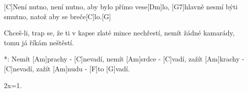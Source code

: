 
[C]Není nutno, není nutno, aby bylo přímo vese[Dm]lo,
[G7]hlavně nesmí býti smutno, natož aby se breče[C]lo.[G]

Chceš-li, trap se, že ti v kapse zlaté mince nechřestí,
nemít žádné kamarády, tomu já říkám neštěstí.

*: Nemít [Am]prachy - [C]nevadí, nemít [Am]srdce - [C]vadí,
zažít [Am]krachy - [C]nevadí, zažít [Am]nudu - [F]to [G]vadí.

2x=1.




